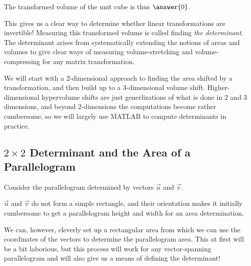 \documentclass{ximera}
\begin{document}
The transformed volume of the unit cube is thus $\answer{0}$.

This gives us a clear way to determine whether linear transformations are invertible! Measuring this transformed volume is called finding \emph{the determinant}. The determinant arises from systematically extending the notions of areas and volumes to give clear ways of measuring volume-stretching and volume-compressing for any matrix transformation.

We will start with a $2$-dimensional approach to finding the area shifted by a transformation, and then build up to a $3$-dimensional volume shift. Higher-dimensional hypervolume shifts are just generlizations of what is done in $2$ and $3$ dimensions, and beyond $2$-dimensions the computations become rather cumbersome, so we will largely use MATLAB to compute determinants in practice. 


    \subsection*{$2\times 2$ Determinant and the Area of a Parallelogram}
     
    Consider the parallelogram determined by vectors $\vec{u}$ and $\vec{v}$.
     
    \begin{center}
    \end{center}

    $\vec{u}$ and $\vec{v}$ do not form a simple rectangle, and their orientation makes it initially cumbersome to get a parallelogram height and width for an area determination. 

    We can, however, cleverly set up a rectangular area from which we can use the coordinates of the vectors to determine the parallelogram area. This at first will be a bit laborious, but this process will work for any vector-spanning parallelogram and will also give us a means of defining the determinant!
\end{document}
